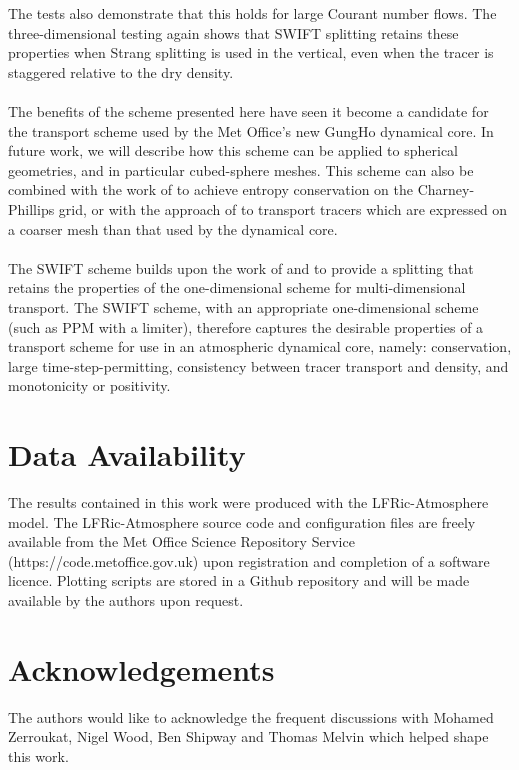 \documentclass[11pt,a4paper]{article}
\begin{document}
The tests also demonstrate that this holds for large Courant number flows. The three-dimensional testing again shows that SWIFT splitting retains these properties when Strang splitting is used in the vertical, even when the tracer is staggered relative to the dry density. \\
\\
The benefits of the scheme presented here have seen it become a candidate for the transport scheme used by the Met Office's new GungHo dynamical core.
In future work, we will describe how this scheme can be applied to spherical geometries, and in particular cubed-sphere meshes.
This scheme can also be combined with the work of \citet{thuburn2022numerical} to achieve entropy conservation on the Charney-Phillips grid, or with the approach of \citet{brown2023physics} to transport tracers which are expressed on a coarser mesh than that used by the dynamical core. \\
\\
The SWIFT scheme builds upon the work of \citet{lin1996ffsl,leonard1996cosmic} and \citet{skamarock2006limiters} to provide a splitting that retains the properties of the one-dimensional scheme for multi-dimensional transport.
The SWIFT scheme, with an appropriate one-dimensional scheme (such as PPM with a limiter), therefore captures the desirable properties of a transport scheme for use in an atmospheric dynamical core, namely: conservation, large time-step-permitting, consistency between tracer transport and density, and monotonicity or positivity. 

\section*{Data Availability}
The results contained in this work were produced with the LFRic-Atmosphere model.
The LFRic-Atmosphere source code and configuration files are freely available from the Met Office Science Repository Service \\
(https://code.metoffice.gov.uk) upon registration and completion of a software licence.
Plotting scripts are stored in a Github repository and will be made available by the authors upon request.

\section*{Acknowledgements}
The authors would like to acknowledge the frequent discussions with Mohamed Zerroukat, Nigel Wood, Ben Shipway and Thomas Melvin which helped shape this work.
\end{document}
